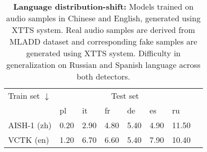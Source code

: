 \begin{table}[t!]
    \caption{\textbf{Language distribution-shift:} Models trained on audio samples in Chinese and English, generated using XTTS system. Real audio samples are derived from MLADD dataset and corresponding fake samples are generated using XTTS system. Difficulty in generalization on Russian and Spanish language across both detectors. }
    \label{tab:lang_tts}
    \vskip 0.15in
\scriptsize
\begin{center}
\begin{sc}
    \begin{tabular}{llllllll}
      \toprule
      Train set $\downarrow$ & \multicolumn{6}{c}{Test set} \\ 
\cmidrule{2-7}
         & pl & it & fr & de & es & ru \\ \hline
  AISH-1 (zh) &0.20 & 2.90 & 4.80& 5.40& 4.90& 11.50\\ 
  \hline
  VCTK (en) &1.20 & 6.70 & 6.60 & 5.40& 7.90 & 10.40\\ 
 \bottomrule 
    \end{tabular}
\end{sc}
\end{center}
\vskip -0.1in
\end{table}
